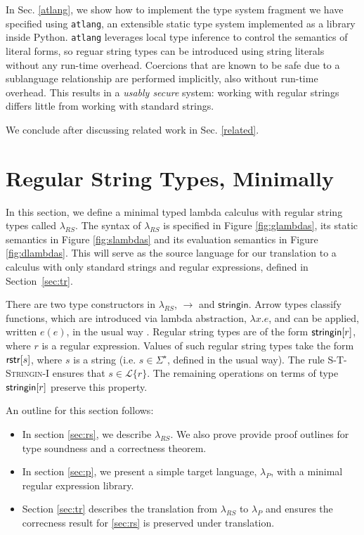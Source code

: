 \documentclass[9pt]{sig-alternate}
\theoremstyle{definition}
\newcommand{\Lagr}{\mathcal{L}}
\newcommand{\lang}[1]{\Lagr\{#1\}}
\newcommand{\lambdas}{\lambda_{RS}}
\newcommand{\lambdap}{\lambda_P}
\newcommand{\sistr}[1]{{\sf rstr}[#1]}   \newcommand{\rstr}[1]{{\sf rstr}[#1]} %
\newcommand{\strin}[1]{\sistr{#1}}
\newcommand{\stringin}[1]{{\sf stringin}[#1]}
\begin{document}
In Sec. \ref{atlang}, we show how to implement the type system fragment we have specified  using \texttt{atlang}, an extensible static type system implemented as a library inside Python. \texttt{atlang} leverages local type inference to control the semantics of literal forms, so reguar string types can be introduced using string literals without any run-time overhead. Coercions that are known to be  safe due to a sublanguage relationship are performed implicitly, also without run-time overhead. This results in a \emph{usably secure} system: working with regular strings differs little from working with standard strings.

We conclude after discussing related work in Sec. \ref{related}.

\section{Regular String Types, Minimally}\label{calculus}






In this section, we define a minimal typed lambda calculus with regular string types called $\lambda_{RS}$. The syntax of $\lambda_{RS}$ is specified in Figure \ref{fig:glambdas}, its static semantics in Figure \ref{fig:slambdas} and its evaluation semantics in Figure \ref{fig:dlambdas}. This will serve as the source language for our translation to a calculus with only standard strings and regular expressions, defined in Section~\ref{sec:tr}. 

There are two type constructors in $\lambdas$, $\rightarrow$ and $\textsf{stringin}$. Arrow types classify functions, which are introduced via lambda abstraction, $\lambda x.e$, and can be applied, written $e(e)$, in the usual way \cite{pfpl}. Regular string types are of the form $\stringin{r}$, where $r$ is a regular expression. Values of such regular string types take the form $\strin{s}$, where $s$ is a string (i.e. $s \in \Sigma^\star$, defined in the usual way). The rule \textsc{S-T-Stringin-I} ensures that $s \in \lang{r}$. The remaining operations on terms of type $\stringin{r}$ preserve this property. %

An outline for this section follows:
\begin{itemize}
\item In section \ref{sec:rs}, we describe $\lambdas$. We also prove provide proof outlines for type soundness and a correctness theorem.
\item In section \ref{sec:p}, we present a simple target language, $\lambdap$, with a minimal regular expression library.
\item Section \ref{sec:tr} describes the translation from $\lambdas$ to $\lambdap$ and ensures the correcness result for \ref{sec:rs} is preserved under translation. 
\end{itemize}
\end{document}
